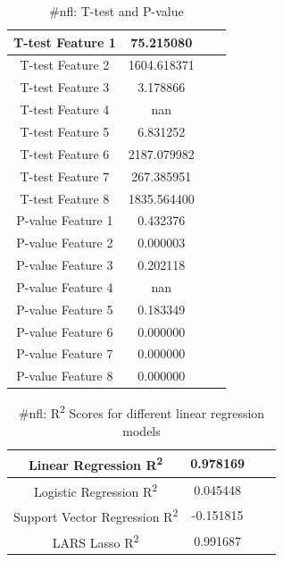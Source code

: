 \documentclass[12pt]{article}
\begin{document}
\begin{table}[H]
	\centering
	\begin{tabular}{| c | c | c | c |}
		\hline 
		T-test Feature 1 & 75.215080 \\\hline
		T-test Feature 2 & 1604.618371 \\\hline
		T-test Feature 3 & 3.178866 \\\hline 
		T-test Feature 4 & nan \\\hline
		T-test Feature 5 & 6.831252 \\\hline
		T-test Feature 6 & 2187.079982 \\\hline
		T-test Feature 7 & 267.385951 \\\hline
		T-test Feature 8 & 1835.564400 \\\hline
		P-value Feature 1 & 0.432376 \\\hline
		P-value Feature 2 & 0.000003 \\\hline
		P-value Feature 3 & 0.202118 \\\hline
		P-value Feature 4 & nan \\\hline
		P-value Feature 5 & 0.183349 \\\hline
		P-value Feature 6 & 0.000000 \\\hline
		P-value Feature 7 & 0.000000 \\\hline
		P-value Feature 8 & 0.000000 \\\hline
	\end{tabular} 
	\caption{\#nfl: T-test and P-value}
	\label{part1:tab1}
\end{table} 


\begin{table}[H]
	\centering
	\begin{tabular}{| c | c | c | c |}
		\hline 
		Linear Regression R\textsuperscript2  & 0.978169 \\\hline
		Logistic Regression R\textsuperscript2  & 0.045448 \\\hline
		Support Vector Regression R\textsuperscript2  & -0.151815 \\\hline
		LARS Lasso R\textsuperscript2  & 0.991687 \\\hline
	\end{tabular} 
	\caption{\#nfl: R\textsuperscript2 Scores for different linear regression models}
	\label{part1:tab1}
\end{table} 
\end{document}

